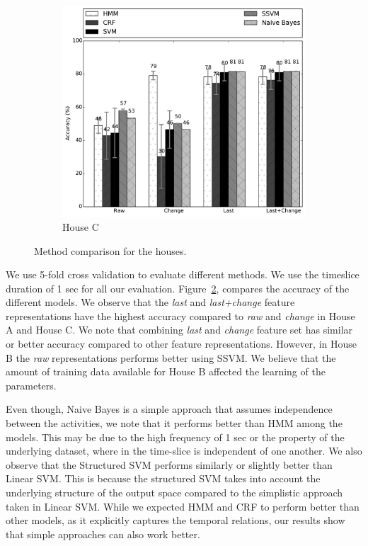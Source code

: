 \begin{figure}
	\begin{subfigure}[b]{0.4\textwidth}
		\includegraphics[height=\textwidth]{../../src/reports/C.pdf}
		\caption{House C}
		\label{fig:chouseC}
	\end{subfigure}
	\caption{Method comparison for the houses.}\label{fig:comparison}
\end{figure}


We use 5-fold cross validation to evaluate different methods. We use the timeslice duration of 1 sec for all our evaluation. 
Figure~\ref{fig:comparison}, compares the accuracy of the different models. 
We observe that the \emph{last} and \emph{last+change} feature representations have the highest accuracy compared to \emph{raw} and \emph{change} in House A and House C. We note that combining \emph{last} and \emph{change} feature set  has similar or better accuracy compared to other feature representations. However, in House B the \emph{raw} representations performs better using SSVM.
We believe that the amount of training data available for House B affected the learning of the parameters. 

Even though, Naive Bayes is a simple approach that assumes independence between the activities, we note that it performs better than HMM among the models.
This may be due to the high frequency of 1 sec or the property of the underlying dataset, where in the time-slice is independent of one another.
We also observe that the Structured SVM performs similarly or slightly better than Linear SVM.
This is because the structured SVM takes into account the underlying structure of the output space compared to the simplistic approach taken in Linear SVM. While we expected HMM and CRF to perform better than other models, as it explicitly captures the temporal relations, our results show that simple approaches can also work better. 



